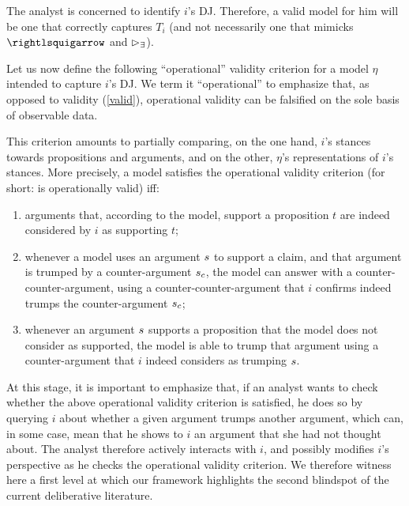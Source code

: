 \documentclass[version=3.21, pagesize, twoside=off, bibliography=totoc, DIV=calc, fontsize=12pt, a4paper, french, english]{scrartcl}
\begin{document}
The analyst is concerned to identify $i$’s \ac{DJ}. Therefore, a valid model for him will be one that correctly captures $T_i$ (and not necessarily one that mimicks $\ileadsto$ and $\mathbin{\vartriangleright_\exists}$).


Let us now define the following “operational” validity criterion for a model $\eta$ intended to capture $i$'s \ac{DJ}. We term it “operational” to emphasize that, as opposed to validity (\cref{valid}), operational validity can be falsified on the sole basis of observable data.


This criterion amounts to partially comparing, on the one hand, $i$'s stances towards propositions and arguments, and on the other, $\eta$'s representations of $i$’s stances. 
More precisely, a model satisfies the operational validity criterion (for short: is operationally valid) iff:
\begin{enumerate}[label=({\roman*}), ref={\roman*}]
	\item arguments that, according to the model, support a proposition $t$ are indeed considered by $i$ as supporting $t$;
	\item whenever a model uses an argument $s$ to support a claim, and that argument is trumped by a counter-argument $s_c$, the model can answer with a counter-counter-argument, using a counter-counter-argument that $i$ confirms indeed trumps the counter-argument $s_c$;
	\item whenever an argument $s$ supports a proposition that the model does not consider as supported, the model is able to trump that argument using a counter-argument that $i$ indeed considers as trumping $s$.
\end{enumerate}

At this stage, it is important to emphasize that, if an analyst wants to check whether the above operational validity criterion is satisfied, he does so by querying $i$ about whether a given argument trumps another argument, which can, in some case, mean that he shows to $i$ an argument that she had not thought about. 
The analyst therefore actively interacts with $i$, and possibly modifies $i$’s perspective as he checks the operational validity criterion. 
We therefore witness here a first level at which our framework highlights the second blindspot of the current deliberative literature.
\end{document}
